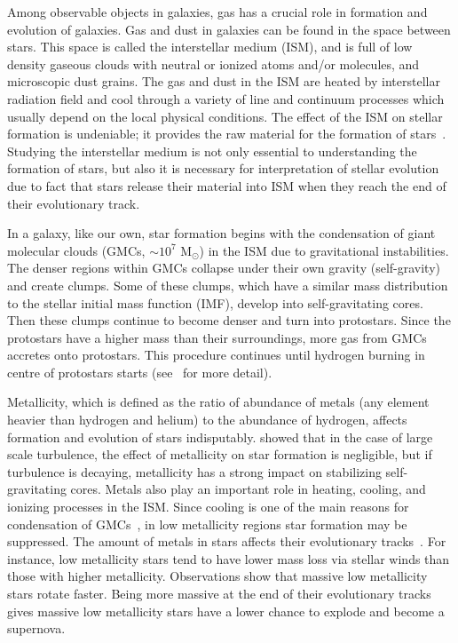Among observable objects in galaxies, gas has a crucial role in formation and evolution of galaxies.
Gas and dust in galaxies can be found in the space between stars.
This space is called the interstellar medium (ISM), and is full of low density gaseous clouds with neutral or ionized atoms and/or molecules, and microscopic dust grains.
The gas and dust in the ISM are heated by interstellar radiation field and cool through a variety of line and continuum processes which usually depend on the local physical conditions. 
The effect of the ISM on stellar formation is undeniable; it provides the raw material for the formation of stars~\citep[e.g.][]{Kennicutt08,Bigiel08}.
Studying the interstellar medium is not only essential to understanding the formation of stars, but also it is necessary for interpretation of stellar evolution due to fact that stars release their material into ISM when they reach the end of their evolutionary track.

In a galaxy, like our own, star formation begins with the condensation of giant molecular clouds (GMCs, $\sim 10^7$ M$_{\odot}$) in the ISM due to gravitational instabilities. 
The denser regions within GMCs collapse under their own gravity (self-gravity) and create clumps.
Some of these clumps, which have a similar mass distribution to the stellar initial mass function (IMF), develop into self-gravitating cores.
Then these clumps continue to become denser and turn into protostars. 
Since the protostars have a higher mass than their surroundings, more gas from GMCs accretes onto protostars.
This procedure continues until hydrogen burning in centre of protostars starts (see~\cite{McKee07} for more detail). 

Metallicity, which is defined as the ratio of abundance of metals (any element heavier than hydrogen and helium) to the abundance of hydrogen, affects formation and evolution of stars indisputably.
\cite{Walch11} showed that in the case of large scale turbulence, the effect of metallicity on star formation is negligible, but if turbulence is decaying,  metallicity has a strong impact on stabilizing self-gravitating cores.
Metals also play an important role in heating, cooling, and ionizing processes in the ISM.
Since cooling is one of the main reasons for condensation of GMCs~\citep[e.g.][]{Maio07}, in low metallicity regions star formation may be suppressed. 
The amount of metals in stars affects their evolutionary tracks~\citep[e.g.][and references therein]{Maeder02}.
For instance, low metallicity stars tend to have lower mass loss via stellar winds than those with higher metallicity.
Observations show that massive low metallicity stars rotate faster.
Being more massive at the end of their evolutionary tracks gives massive low metallicity stars have a lower chance to explode and become a supernova.


